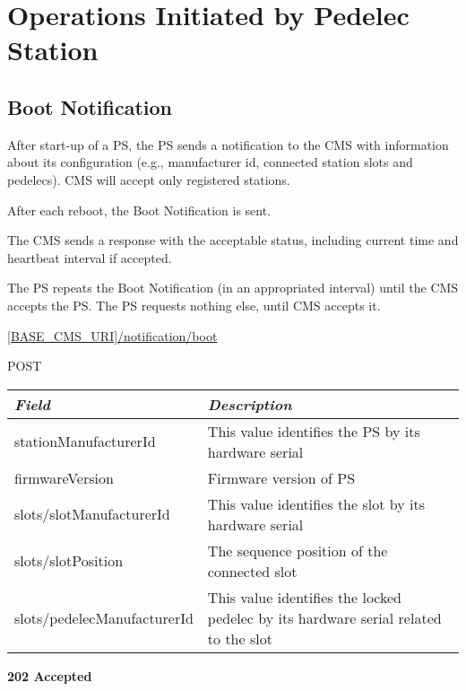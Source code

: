 \section{Operations Initiated by Pedelec Station}

\subsection{Boot Notification}

After start-up of a \acs{PS}, the \acs{PS} sends a notification to the \acs{CMS} with information about its configuration (e.g., manufacturer id, connected station slots and pedelecs). \acs{CMS} will accept only registered stations. 

After each reboot, the Boot Notification is sent.

The \acs{CMS} sends a response with the acceptable status, including current time and heartbeat interval if accepted.

The \acs{PS} repeats the Boot Notification (in an appropriated interval) until the \acs{CMS} accepts the \acs{PS}. The \acs{PS} requests nothing else, until \acs{CMS} accepts it.


 \url{[BASE_CMS_URI]/notification/boot}

 POST

\begin{table}[!h]
\vspace{-7mm}
\begin{tabularx}{\linewidth}{ | l | X | }
  \hline
  \textit{Field} & \textit{Description} \\
  \hline \hline
  stationManufacturerId 		& This value identifies the \acs{PS} by its hardware serial \\
  firmwareVersion			& Firmware version of \acs{PS}\\
  slots/slotManufacturerId 	& This value identifies the slot by its hardware serial \\
  slots/slotPosition			& The sequence position of the connected slot \\
  slots/pedelecManufacturerId & This value identifies the locked pedelec by its hardware serial related to the slot \\
    \hline
\end{tabularx}
\end{table}

\textbf{202 Accepted}

